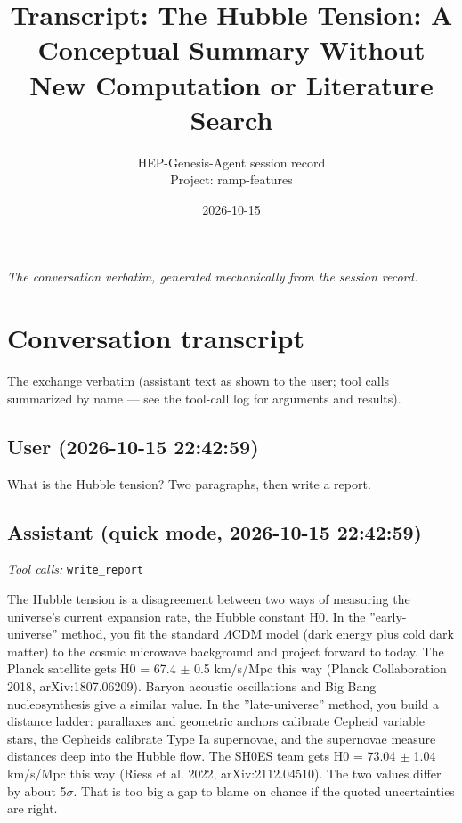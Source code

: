 \documentclass[11pt,a4paper]{article}
\title{Transcript: The Hubble Tension: A Conceptual Summary Without New Computation or Literature Search}
\author{HEP-Genesis-Agent session record \\ \small Project: ramp-features}
\date{2026-10-15}
\begin{document}
\maketitle
\noindent\textit{\small The conversation verbatim, generated mechanically from the session record.}
\vspace{1em}



\appendix
\section{Conversation transcript}
\label{app:transcript}
The exchange verbatim (assistant text as shown to the user; tool calls summarized by name --- see the tool-call log for arguments and results).
\subsection*{User \small(2026-10-15 22:42:59)}
What is the Hubble tension? Two paragraphs, then write a report.

\subsection*{Assistant \small(quick mode, 2026-10-15 22:42:59)}
\textit{Tool calls:} \texttt{write\_report}\par
The Hubble tension is a disagreement between two ways of measuring the universe's current expansion rate, the Hubble constant H0. In the ''early-universe'' method, you fit the standard $\Lambda$CDM model (dark energy plus cold dark matter) to the cosmic microwave background and project forward to today. The Planck satellite gets H0 = 67.4 $\pm$ 0.5 km/s/Mpc this way (Planck Collaboration 2018, arXiv:1807.06209). Baryon acoustic oscillations and Big Bang nucleosynthesis give a similar value. In the ''late-universe'' method, you build a distance ladder: parallaxes and geometric anchors calibrate Cepheid variable stars, the Cepheids calibrate Type Ia supernovae, and the supernovae measure distances deep into the Hubble flow. The SH0ES team gets H0 = 73.04 $\pm$ 1.04 km/s/Mpc this way (Riess et al. 2022, arXiv:2112.04510). The two values differ by about 5$\sigma$. That is too big a gap to blame on chance if the quoted uncertainties are right.
\end{document}
